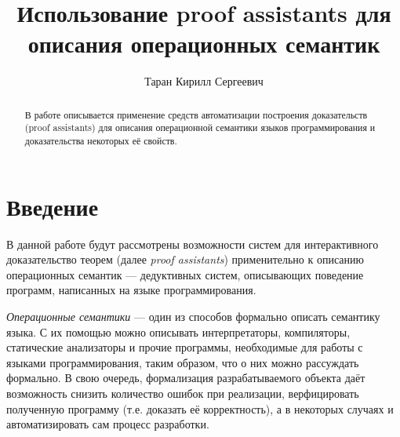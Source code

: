 \lstset{
   escapechar=`,
   basicstyle=\ttfamily\footnotesize,
   extendedchars=\true
}

\newcommand{\ctab}[0]{\indent\indent}
\newcommand{\ctabd}[0]{\ctab\ctab}
\newcommand{\ccode}[1]{\mbox{\texttt{#1}}}

\newcommand{\lcode}[1]{\lstinline[basicstyle=\ttfamily\normalsize]{#1}}

\title{Использование proof assistants для описания операционных семантик}
%
\author{Таран Кирилл Сергеевич}
%
%
%

\maketitle              %

\begin{abstract}
В работе описывается применение средств автоматизации построения доказательств (proof
assistants) для описания операционной семантики языков программирования и доказательства
некоторых её свойств.
\end{abstract}

\section*{Введение}

     В данной работе будут рассмотрены возможности систем для интерактивного доказательство теорем (далее \emph{proof assistants}) применительно к описанию операционных семантик --- дедуктивных систем, описывающих поведение программ, написанных на языке программирования.

     \emph{Операционные семантики} --- один из способов формально описать семантику языка. С их помощью можно описывать интерпретаторы, компиляторы, статические анализаторы и прочие программы, необходимые для работы с языками программирования, таким образом, что о них можно рассуждать формально. В свою очередь, формализация разрабатываемого объекта даёт возможность снизить количество ошибок при реализации, верфицировать полученную программу (т.е. доказать её корректность), а в некоторых случаях и автоматизировать сам процесс разработки.

